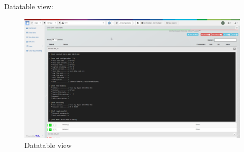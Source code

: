 Datatable view:

\begin{figure}[h!]
  \includegraphics[width=1\linewidth]{./pictures/Datatable.png}
  \caption{Datatable view}
\end{figure}
